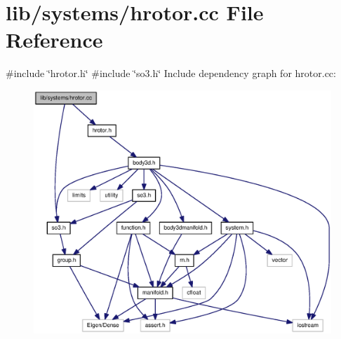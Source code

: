 \section{lib/systems/hrotor.cc \-File \-Reference}
\label{hrotor_8cc}
{\ttfamily \#include \char`\"{}hrotor.\-h\char`\"{}}\*
{\ttfamily \#include \char`\"{}so3.\-h\char`\"{}}\*
\-Include dependency graph for hrotor.\-cc\-:
\nopagebreak
\begin{figure}[H]
\begin{center}
\leavevmode
\includegraphics[width=350pt]{hrotor_8cc__incl}
\end{center}
\end{figure}
